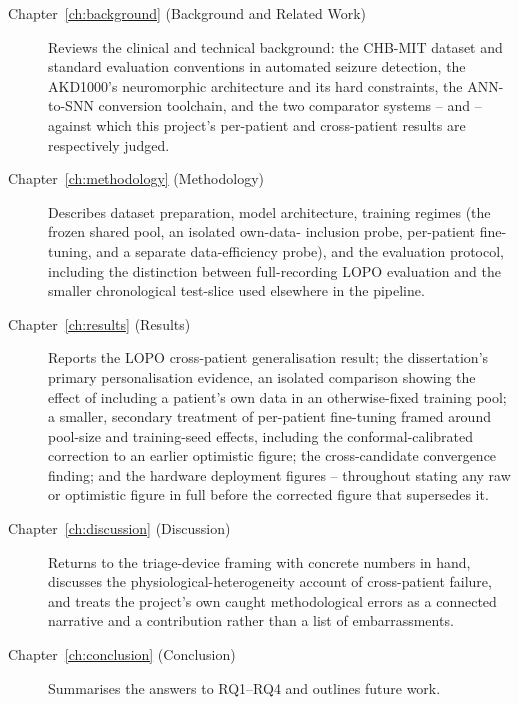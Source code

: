 \begin{description}
    \item[Chapter~\ref{ch:background} (Background and Related Work)] Reviews the clinical and technical background: the CHB-MIT dataset and standard evaluation conventions in 
    automated seizure detection, the AKD1000's neuromorphic architecture and its hard constraints, the ANN-to-SNN conversion toolchain, and the two 
    comparator systems --\citet{shoeb2009} and \citet{ali2024} --against which this project's per-patient and cross-patient results are respectively judged.
    \item[Chapter~\ref{ch:methodology} (Methodology)] Describes dataset preparation, model architecture, training regimes (the frozen shared pool, an isolated own-data-
    inclusion probe, per-patient fine-tuning, and a separate data-efficiency probe), and the evaluation protocol, including the distinction between full-recording LOPO evaluation and 
    the smaller chronological test-slice used elsewhere in the pipeline.
    \item[Chapter~\ref{ch:results} (Results)] Reports the LOPO cross-patient generalisation result; the dissertation's primary personalisation evidence, an isolated comparison showing
     the effect of including a patient's own data in an otherwise-fixed training pool; a smaller, secondary treatment of per-patient fine-tuning framed around pool-size and 
     training-seed effects, including the conformal-calibrated correction to an earlier optimistic figure; the cross-candidate convergence finding; and the hardware deployment
    figures -- throughout stating any raw or optimistic figure in full before the corrected figure that supersedes it.
    \item[Chapter~\ref{ch:discussion} (Discussion)] Returns to the triage-device framing with concrete numbers in hand, discusses the physiological-heterogeneity account of 
    cross-patient failure, and treats the project's own caught methodological errors as a connected narrative and a contribution rather than a list of embarrassments.
    \item[Chapter~\ref{ch:conclusion} (Conclusion)] Summarises the answers to RQ1--RQ4 and outlines future work.
\end{description}
